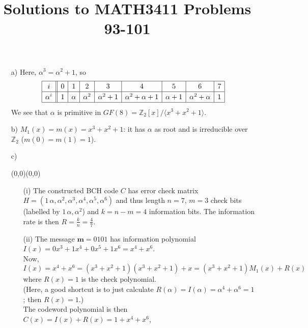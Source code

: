 \documentclass[11pt]{article}
\date{}
\author{}
\title{\sc Solutions to MATH3411 Problems 93-101}
\renewcommand{\vec}[1]{\mathbf{#1}}
\newcommand{\moveup}{\begin{picture}(0,0)(0,0)\end{picture}\vspace*{-8.15mm}}
\begin{document}
 \maketitle

\vspace*{-10mm}

\begin{itemize}
  \item[a)] Here, $\alpha^3 = \alpha^2 + 1$, so
  \[{\renewcommand*{\arraystretch}{1.2}
    \begin{array}{|c||c|c|c|c|c|c|c|c|c|}\hline
             i &  0  &    1   &    2     &      3     &         4         &    5     &          6        &     7   \\\hline
      \alpha^i &  1  & \alpha & \alpha^2 & \alpha^2+1 & \alpha^2+\alpha+1 & \alpha+1 & \alpha^2 + \alpha &     1   \\\hline
    \end{array}}\]
    We see that $\alpha$ is primitive in $GF(8) = \mathbb{Z}_2[x]/\langle x^3+x^2+1\rangle$.
  \item[b)] $M_1(x) = m(x) = x^3 + x^2 + 1$: it has $\alpha$ as root and is irreducible over $\mathbb{Z}_2$ ($m(0)=m(1)=1$).
  \item[c)]\moveup
    \begin{itemize}
      \item[(i)]   The constructed BCH code $C$ has
                   error check matrix $H = (1\,\alpha,\alpha^2,\alpha^3,\alpha^4,\alpha^5,\alpha^6)$
                   and thus length $n = 7$, $m = 3$ check bits (labelled by $1\,\alpha,\alpha^2$)
                   and $k = n - m = 4$ information bits.
                   The information rate is then $R = \frac{k}{n} = \frac{4}{7}$.
      \item[(ii)]  The message $\vec{m} = \text{0101}$ has
                   information polynomial $I(x) = 0x^3+ 1x^4 + 0x^5 + 1x^6 = x^4 + x^6$.\\
                   Now,  $I(x) = x^4 + x^6 = (x^3+x^2+1)(x^3+x^2+1) + x = (x^3+x^2+1)M_1(x) + R(x)$\\
                   where $R(x) = 1$ is the check polynomial.\\
                   (Here, a good shortcut is to just calculate
                   $R(\alpha) = I(\alpha) = \alpha^4 + \alpha^6 = 1$;
                   then $R(x) = 1$.)\\
                   The codeword polynomial is then $C(x) = I(x) + R(x) = 1 + x^4 + x^6$,\\

\end{itemize}
\end{itemize}
\end{document}
